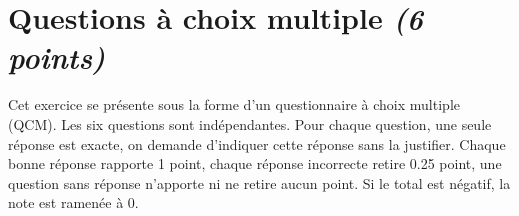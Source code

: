 
\section{Questions à choix multiple \textit{(6 points)}}

Cet exercice se présente sous la forme d'un questionnaire à choix multiple (QCM). Les six questions sont indépendantes. Pour chaque question, une seule réponse est exacte, on demande d'indiquer cette réponse sans la justifier. Chaque bonne réponse rapporte 1 point, chaque réponse incorrecte retire \num{0.25} point, une question sans réponse n'apporte ni ne retire aucun point. Si le total est négatif, la note est ramenée à 0.

\vspace*{0.5cm}

